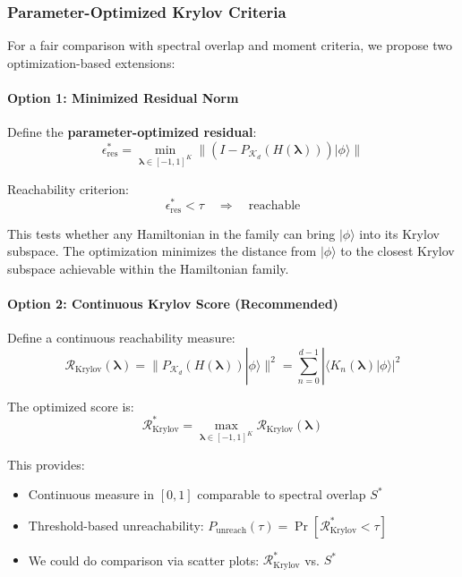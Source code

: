 \documentclass[ a4paper, 
                amsfonts, 
                amssymb, 
                amsmath, 
                reprint, 
                showkeys, 
                nofootinbib,
                superscriptaddress, 
                onecolumn, 
                notitlepage,
                aps,
                pra,
                longbibliography]{revtex4-1}
\theoremstyle{definition}
\begin{document}
\subsubsection{Parameter-Optimized Krylov Criteria}

For a fair comparison with spectral overlap and moment criteria, we propose two optimization-based extensions:

\paragraph{Option 1: Minimized Residual Norm}

Define the \textbf{parameter-optimized residual}:
\begin{equation}
\epsilon^*_{\text{res}} = \min_{\boldsymbol{\lambda} \in [-1,1]^K} \|(I - P_{\mathcal{K}_d}(H(\boldsymbol{\lambda})))|\phi\rangle\|
\end{equation}

Reachability criterion:
\begin{equation}
\epsilon^*_{\text{res}} < \tau \quad \Rightarrow \quad \text{reachable}
\end{equation}

This tests whether any Hamiltonian in the family can bring $|\phi\rangle$ into its Krylov subspace. The optimization minimizes the distance from $|\phi\rangle$ to the closest Krylov subspace achievable within the Hamiltonian family.


\paragraph{Option 2: Continuous Krylov Score (Recommended)}

Define a continuous reachability measure:
\begin{equation}
\mathcal{R}_{\text{Krylov}}(\boldsymbol{\lambda}) = \|P_{\mathcal{K}_d}(H(\boldsymbol{\lambda}))|\phi\rangle\|^2 = \sum_{n=0}^{d-1} |\langle K_n(\boldsymbol{\lambda})|\phi\rangle|^2
\label{eq:krylov_score}
\end{equation}

The optimized score is:
\begin{equation}
\mathcal{R}^*_{\text{Krylov}} = \max_{\boldsymbol{\lambda} \in [-1,1]^K} \mathcal{R}_{\text{Krylov}}(\boldsymbol{\lambda})
\end{equation}

This provides:
\begin{itemize}
\item Continuous measure in $[0,1]$ comparable to spectral overlap $S^*$
\item Threshold-based unreachability: $P_{\text{unreach}}(\tau) = \Pr[\mathcal{R}^*_{\text{Krylov}} < \tau]$
\item We could do comparison via scatter plots: $\mathcal{R}^*_{\text{Krylov}}$ vs. $S^*$ 
\end{itemize}
\end{document}

